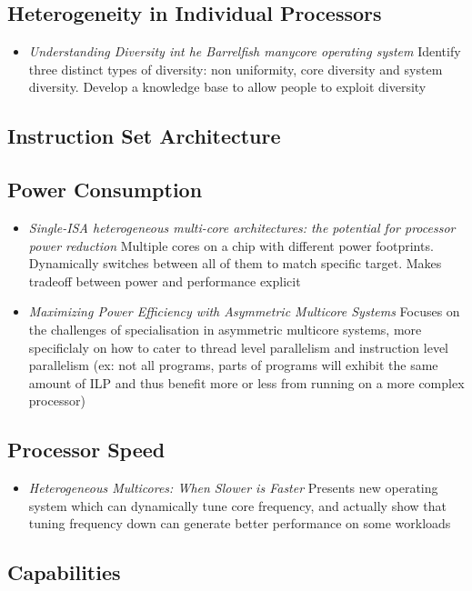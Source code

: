 \subsection{Heterogeneity in Individual Processors}
\begin{itemize}
\item \emph{Understanding Diversity int he Barrelfish manycore operating system}
Identify three distinct types of diversity: non uniformity, core diversity and 
system diversity. Develop a knowledge base to allow people to exploit
diversity
\end{itemize}
\subsection{Instruction Set Architecture}
\subsection{Power Consumption}
\begin{itemize}
\item \emph{Single-ISA heterogeneous multi-core architectures: the potential 
for processor power reduction}  Multiple cores on a chip with different power
footprints. Dynamically switches between all of them to match specific target.
Makes tradeoff between power and performance explicit
\item \emph {Maximizing Power Efficiency with Asymmetric Multicore Systems
} Focuses on the challenges of specialisation in asymmetric multicore systems,
more specificlaly on how to cater to thread level parallelism and instruction level
parallelism (ex: not all programs, parts of programs will exhibit the same
amount of ILP and thus benefit more or less from running on a more complex
processor)
\end{itemize}
\subsection{Processor Speed}
\begin{itemize}
\item \emph{Heterogeneous Multicores: When Slower is Faster}
Presents new operating system which can dynamically tune core
frequency, and actually show that tuning frequency down
can generate better performance on some workloads 
\end{itemize}
\subsection{Capabilities}

